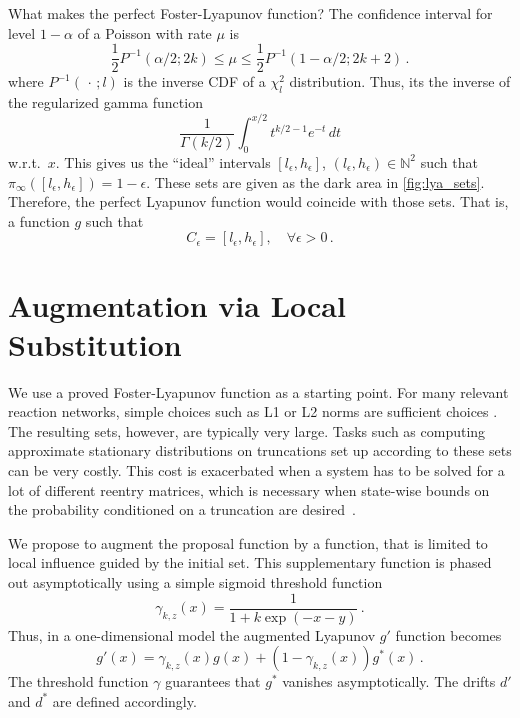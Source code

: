 \begin{example}
What makes the perfect Foster-Lyapunov function?
The confidence interval for level $1-\alpha$ of a Poisson with rate $\mu$ is
\[
\frac{1}{2}P^{-1}(\alpha/2; 2k)\le\mu\leq\frac{1}{2}P^{-1}(1-\alpha/2;{2k+2})\,.
\]
where $P^{-1}(\,\cdot\,; l)$ is the inverse \ac{CDF} of a $\chi^2_{l}$ distribution.
Thus, its the inverse of the regularized gamma function
\[
	\frac{1}{\Gamma(k/2)}\int_0^{x/2} t^{k/2 - 1} e^{-t}\,dt
\]
w.r.t.\ $x$.
	This gives us the ``ideal'' intervals $[l_{\epsilon},h_{\epsilon}]$, $(l_{\epsilon},h_{\epsilon})\in\mathbb{N}^2$ such that
	$\pi_{\infty}([l_{\epsilon},h_{\epsilon}])=1-\epsilon$. These sets are given as the dark area in \autoref{fig:lya_sets}.
Therefore, the perfect Lyapunov function would coincide with those sets. That is,
a function $g$ such that
\[
	C_{\epsilon}
	=
	\left[l_{\epsilon}, h_{\epsilon}\right], \quad \forall\epsilon> 0\,.
\]
\end{example}

\section{Augmentation via Local Substitution}
We use a proved Foster-Lyapunov function as a starting point.
For many relevant reaction networks, simple choices such as L1 or L2 norms are sufficient choices \cite{spieler2014numerical}.
The resulting sets, however, are typically very large.
Tasks such as computing approximate stationary distributions on truncations set up according to these sets can be very costly.
This cost is exacerbated when a system has to be solved for a lot of different reentry matrices, which is necessary when state-wise bounds on the probability conditioned on a truncation are desired~\cite{dayar2011bounding}.

We propose to augment the proposal function by a function, that is limited to local influence guided by the initial set.
This supplementary function is phased out asymptotically using a simple sigmoid threshold function
\begin{equation}\label{eq:threshold}
  \gamma_{k,z}(x) = \frac{1}{1+k\exp(-x - y)}\,.
\end{equation}
Thus, in a one-dimensional model the augmented Lyapunov $g'$ function becomes
\begin{equation}\label{eq:thres_lyapunov}
    g'(x) = \gamma_{k,z}(x) g(x) + (1 - \gamma_{k,z}(x)) g^*(x)\,.
\end{equation}
The threshold function $\gamma$ guarantees that $g^*$ vanishes asymptotically.
The drifts $d'$ and $d^*$ are defined accordingly.


